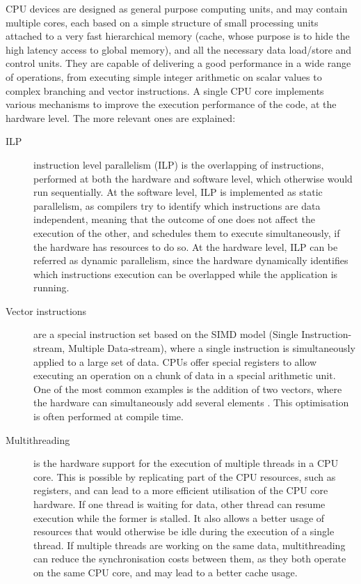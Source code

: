 CPU devices are designed as general purpose computing units, and may contain multiple cores, each based on a simple structure of small processing units attached to a very fast hierarchical memory (cache, whose purpose is to hide the high latency access to global memory), and all the necessary data load/store and control units. They are capable of delivering a good performance in a wide range of operations, from executing simple integer arithmetic on scalar values to complex branching and vector instructions. A single CPU core implements various mechanisms to improve the execution performance of the code, at the hardware level. The more relevant ones are explained:

\begin{center}
	\begin{description}
		\item[ILP] instruction level parallelism (ILP) is the overlapping of instructions, performed at both the hardware and software level, which otherwise would run sequentially. At the software level, ILP is implemented as static parallelism, as compilers try to identify which instructions are data independent, meaning that the outcome of one does not affect the execution of the other, and schedules them to execute simultaneously, if the hardware has resources to do so. At the hardware level, ILP can be referred as dynamic parallelism, since the hardware dynamically identifies which instructions execution can be overlapped while the application is running.

		\item[Vector instructions] are a special instruction set based on the SIMD model (Single Instruction-stream, Multiple Data-stream), where a single instruction is simultaneously applied to a large set of data. CPUs offer special registers to allow executing an operation on a chunk of data in a special arithmetic unit. One of the most common examples is the addition of two vectors, where the hardware can simultaneously add several elements . This optimisation is often performed at compile time.

		\item[Multithreading] is the hardware support for the execution of multiple threads in a CPU core. This is possible by replicating part of the CPU resources, such as registers, and can lead to a more efficient utilisation of the CPU core hardware. If one thread is waiting for data, other thread can resume execution while the former is stalled. It also allows a better usage of resources that would otherwise be idle during the execution of a single thread. If multiple threads are working on the same data, multithreading can reduce the synchronisation costs between them, as they both operate on the same CPU core, and may lead to a better cache usage.
	\end{description}
\end{center}

